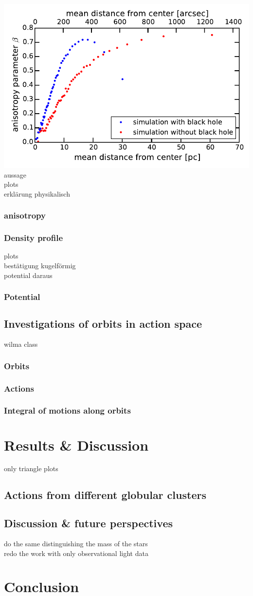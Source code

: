 \documentclass[a4paper,12pt,abstracton]{scrartcl}
\begin{document}
\includegraphics{Plots/anisotropy_parameter_beta.pdf}
aussage\\
plots\\
erklärung physikalisch
\subsubsection{anisotropy}
\subsubsection{Density profile}
plots\\
bestätigung kugelförmig\\
potential daraus
\subsubsection{Potential}

\subsection{Investigations of orbits in action space}
wilma class 
\subsubsection{Orbits}
\subsubsection{Actions}
\subsubsection{Integral of motions along orbits}
\newpage
\section{Results \& Discussion}
only triangle plots

\subsection{Actions from different globular clusters}
\subsection{Discussion \& future perspectives}
do the same distinguishing the mass of the stars\\
redo the work with only observational light data
\newpage
\section{Conclusion}
\end{document}
